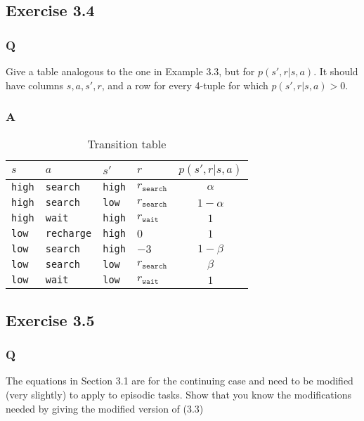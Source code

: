 \subsection{Exercise 3.4}
\subsubsection{Q}
Give a table analogous to the one in Example 3.3, but for $p(s', r| s, a)$. It should have columns $s, a, s', r$, and a row for every 4-tuple for which $p(s', r | s, a) > 0$.

\subsubsection{A}
\begin{table}[h!]
\centering
\begin{tabular}{ll|ll|c}
    $s$ & $a$ & $s'$ & $r$ & $p(s', r | s, a)$ \\
    \hline
     \texttt{high}& \texttt{search}&  \texttt{high}&  $r_{\texttt{search}}$& $\alpha$  \\
     \texttt{high}& \texttt{search}&  \texttt{low}&   $r_{\texttt{search}}$& $1 - \alpha$ \\
     \texttt{high}& \texttt{wait}&  \texttt{high}&   $r_{\texttt{wait}}$&  $1$ \\
     \texttt{low}& \texttt{recharge}&   \texttt{high}&    $0$&   $1$\\
     \texttt{low}& \texttt{search}&  \texttt{high}&  $-3$& $1 - \beta$  \\
     \texttt{low}& \texttt{search}&  \texttt{low}&   $r_{\texttt{search}}$& $\beta $\\
     \texttt{low}& \texttt{wait}&  \texttt{low}&   $r_{\texttt{wait}}$&  $1$
\end{tabular}


\caption{Transition table}
\label{table:3.4}
\end{table}


\subsection{Exercise 3.5}
\subsubsection{Q}
The equations in Section 3.1 are for the continuing case and need to be modified (very slightly) to apply to episodic tasks. Show that you know the modifications needed by giving the modified version of (3.3)

